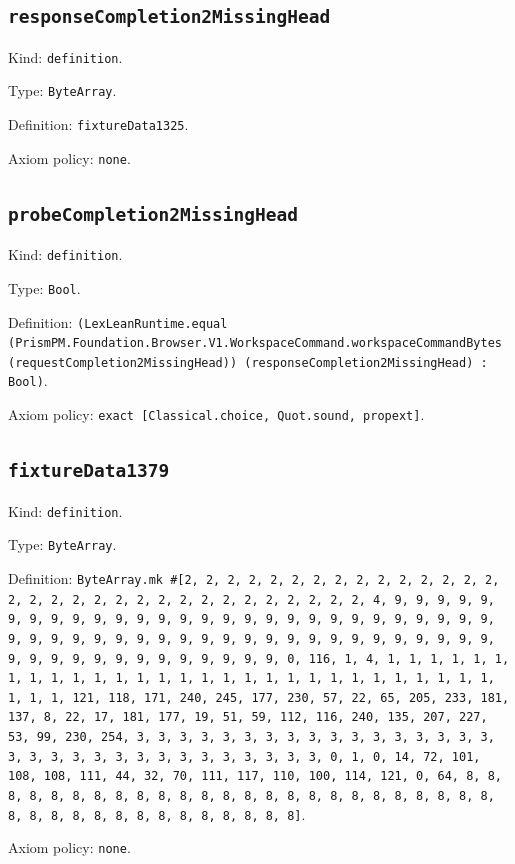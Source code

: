 \documentclass[11pt]{article}
\begin{document}
\subsection*{\texttt{responseCompletion2MissingHead}}
\noindent Kind: \texttt{definition}.\par
\noindent Type: \texttt{ByteArray}.\par
\noindent Definition: \texttt{fixtureData1325}.\par
\noindent Axiom policy: \texttt{none}.\par
\subsection*{\texttt{probeCompletion2MissingHead}}
\noindent Kind: \texttt{definition}.\par
\noindent Type: \texttt{Bool}.\par
\noindent Definition: \texttt{(LexLeanRuntime.equal (PrismPM.Foundation.Browser.V1.WorkspaceCommand.workspaceCommandBytes (requestCompletion2MissingHead)) (responseCompletion2MissingHead) : Bool)}.\par
\noindent Axiom policy: \texttt{exact [Classical.choice, Quot.sound, propext]}.\par
\subsection*{\texttt{fixtureData1379}}
\noindent Kind: \texttt{definition}.\par
\noindent Type: \texttt{ByteArray}.\par
\noindent Definition: \texttt{ByteArray.mk \#[2, 2, 2, 2, 2, 2, 2, 2, 2, 2, 2, 2, 2, 2, 2, 2, 2, 2, 2, 2, 2, 2, 2, 2, 2, 2, 2, 2, 2, 2, 2, 2, 4, 9, 9, 9, 9, 9, 9, 9, 9, 9, 9, 9, 9, 9, 9, 9, 9, 9, 9, 9, 9, 9, 9, 9, 9, 9, 9, 9, 9, 9, 9, 9, 9, 9, 9, 9, 9, 9, 9, 9, 9, 9, 9, 9, 9, 9, 9, 9, 9, 9, 9, 9, 9, 9, 9, 9, 9, 9, 9, 9, 9, 9, 9, 9, 9, 0, 116, 1, 4, 1, 1, 1, 1, 1, 1, 1, 1, 1, 1, 1, 1, 1, 1, 1, 1, 1, 1, 1, 1, 1, 1, 1, 1, 1, 1, 1, 1, 1, 1, 1, 1, 121, 118, 171, 240, 245, 177, 230, 57, 22, 65, 205, 233, 181, 137, 8, 22, 17, 181, 177, 19, 51, 59, 112, 116, 240, 135, 207, 227, 53, 99, 230, 254, 3, 3, 3, 3, 3, 3, 3, 3, 3, 3, 3, 3, 3, 3, 3, 3, 3, 3, 3, 3, 3, 3, 3, 3, 3, 3, 3, 3, 3, 3, 3, 3, 0, 1, 0, 14, 72, 101, 108, 108, 111, 44, 32, 70, 111, 117, 110, 100, 114, 121, 0, 64, 8, 8, 8, 8, 8, 8, 8, 8, 8, 8, 8, 8, 8, 8, 8, 8, 8, 8, 8, 8, 8, 8, 8, 8, 8, 8, 8, 8, 8, 8, 8, 8, 8, 8, 8, 8, 8, 8, 8]}.\par
\noindent Axiom policy: \texttt{none}.\par
\end{document}

